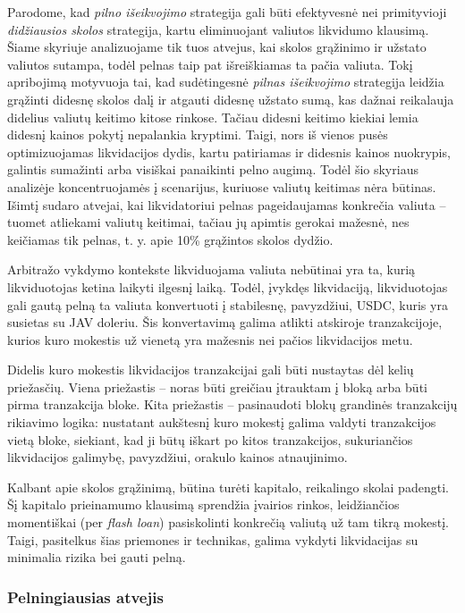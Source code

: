 \documentclass[]{VUMIFTemplateClass}
\begin{document}
Parodome, kad \textit{pilno išeikvojimo} strategija gali būti efektyvesnė nei primityvioji \textit{didžiausios skolos} strategija, kartu eliminuojant valiutos likvidumo klausimą. Šiame skyriuje analizuojame tik tuos atvejus, kai skolos grąžinimo ir užstato valiutos sutampa, todėl pelnas taip pat išreiškiamas ta pačia valiuta. Tokį apribojimą motyvuoja tai, kad sudėtingesnė \textit{pilnas išeikvojimo} strategija leidžia grąžinti didesnę skolos dalį ir atgauti didesnę užstato sumą, kas dažnai reikalauja didelius valiutų keitimo kitose rinkose. Tačiau didesni keitimo kiekiai lemia didesnį kainos pokytį nepalankia kryptimi. Taigi, nors iš vienos pusės optimizuojamas likvidacijos dydis, kartu patiriamas ir didesnis kainos nuokrypis, galintis sumažinti arba visiškai panaikinti pelno augimą. Todėl šio skyriaus analizėje koncentruojamės į scenarijus, kuriuose valiutų keitimas nėra būtinas. Išimtį sudaro atvejai, kai likvidatoriui pelnas pageidaujamas konkrečia valiuta – tuomet atliekami valiutų keitimai, tačiau jų apimtis gerokai mažesnė, nes keičiamas tik pelnas, t. y. apie 10\% grąžintos skolos dydžio.

Arbitražo vykdymo kontekste likviduojama valiuta nebūtinai yra ta, kurią likviduotojas ketina laikyti ilgesnį laiką. Todėl, įvykdęs likvidaciją, likviduotojas gali gautą pelną ta valiuta konvertuoti į stabilesnę, pavyzdžiui, USDC, kuris yra susietas su JAV doleriu. Šis konvertavimą galima atlikti atskiroje tranzakcijoje, kurios kuro mokestis už vienetą yra mažesnis nei pačios likvidacijos metu.

Didelis kuro mokestis likvidacijos tranzakcijai gali būti nustaytas dėl kelių priežasčių. Viena priežastis – noras būti greičiau įtrauktam į bloką arba būti pirma tranzakcija bloke. Kita priežastis – pasinaudoti blokų grandinės tranzakcijų rikiavimo logika: nustatant aukštesnį kuro mokestį galima valdyti tranzakcijos vietą bloke, siekiant, kad ji būtų iškart po kitos tranzakcijos, sukuriančios likvidacijos galimybę, pavyzdžiui, orakulo kainos atnaujinimo.

Kalbant apie skolos grąžinimą, būtina turėti kapitalo, reikalingo skolai padengti. Šį kapitalo prieinamumo klausimą sprendžia įvairios rinkos, leidžiančios momentiškai (per \textit{flash loan}) pasiskolinti konkrečią valiutą už tam tikrą mokestį. Taigi, pasitelkus šias priemones ir technikas, galima vykdyti likvidacijas su minimalia rizika bei gauti pelną.

\subsubsection{Pelningiausias atvejis}
\end{document}
